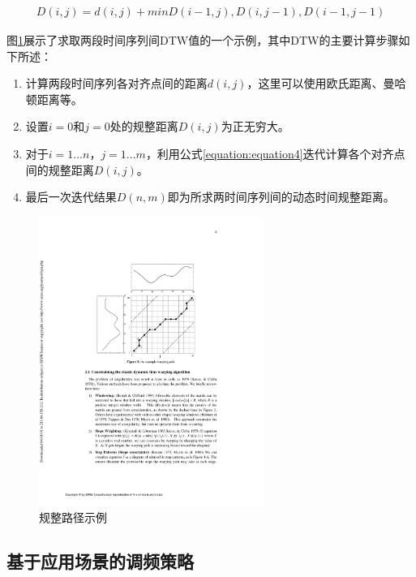 \begin{equation}
    \label{equation:equation4}
    \begin{aligned}
        D(i,j) = d(i,j) + min{D(i-1,j),D(i,j-1),D(i-1,j-1)}
    \end{aligned}
\end{equation}

图\ref{figure:figure40}展示了求取两段时间序列间DTW值的一个示例，其中DTW的主要计算步骤如下所述：
\begin{enumerate}
  \item 计算两段时间序列各对齐点间的距离$d(i,j)$，这里可以使用欧氏距离、曼哈顿距离等。
  \item 设置$i = 0$和$j = 0$处的规整距离$D(i,j)$为正无穷大。
  \item 对于$i = 1 ... n$，$j = 1 ... m$，利用公式\ref{equation:equation4}迭代计算各个对齐点间的规整距离$D(i,j)$。
  \item 最后一次迭代结果$D(n,m)$即为所求两时间序列间的动态时间规整距离。
\end{enumerate}

\begin{figure}[htbp]
    \centering
    \includegraphics[height=0.56\textwidth, width=0.65\textwidth]{figures/dtw_dist.pdf}
    \caption{规整路径示例 \cite{keogh2001derivative}}\label{figure:figure40}
\end{figure}

\subsection{基于应用场景的调频策略}

